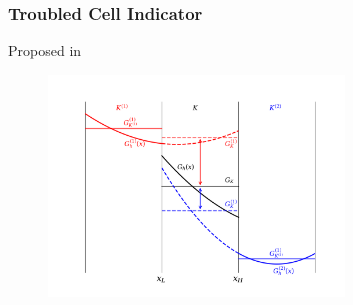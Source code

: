 \documentclass{beamer}
\begin{document}
\begin{frame}
\frametitle{Troubled Cell Indicator}

  Proposed in \citet{fs2017}

  \begin{figure}[htb!]
    \centering
    \includegraphics[width=0.7\textwidth]{fig.TCI.png}
  \end{figure}

\end{frame}
\end{document}
